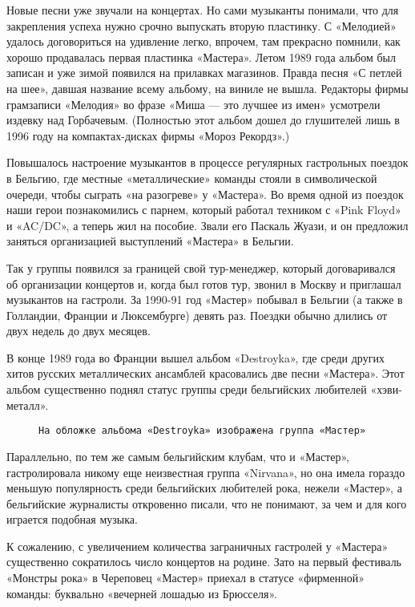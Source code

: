 Новые песни уже звучали на концертах. Но сами музыканты понимали, что для закрепления успеха нужно срочно выпускать
вторую пластинку. С «Мелодией» удалось договориться на удивление легко, впрочем, там прекрасно помнили, как хорошо
продавалась первая пластинка «Мастера». Летом 1989 года альбом был записан и уже зимой появился на прилавках магазинов.
Правда песня «С петлей на шее», давшая название всему альбому, на виниле не вышла. Редакторы фирмы грамзаписи «Мелодия»
во фразе «Миша — это лучшее из имен» усмотрели издевку над Горбачевым. (Полностью этот альбом дошел до глушителей лишь в
1996 году на компактах-дисках фирмы «Мороз Рекордз».)

Повышалось настроение музыкантов в процессе регулярных гастрольных поездок в Бельгию, где местные «металлические»
команды стояли в символической очереди, чтобы сыграть «на разогреве» у «Мастера». Во время одной из поездок наши герои
познакомились с парнем, который работал техником с «Pink Floyd» и «AC/DC», а теперь жил на пособие. Звали его Паскаль
Жуази, и он предложил заняться организацией выступлений «Мастера» в Бельгии.

Так у группы появился за границей свой тур-менеджер, который договаривался об организации концертов и, когда был готов
тур, звонил в Москву и приглашал музыкантов на гастроли. За 1990-91 год «Мастер» побывал в Бельгии (а также в Голландии,
Франции и Люксембурге) девять раз. Поездки обычно длились от двух недель до двух месяцев.

В конце 1989 года во Франции вышел альбом «Destroyka», где среди других хитов русских металлических ансамблей
красовались две песни «Мастера». Этот альбом существенно поднял статус группы среди бельгийских любителей «хэви-металл».

\begin{wrapfigure}{L}{0.5\textwidth}
    \centering
    \caption{\texttt{На обложке альбома «Destroykа» изображена группа «Мастер»}}
\end{wrapfigure}

Параллельно, по тем же самым бельгийским клубам, что и «Мастер», гастролировала никому еще неизвестная группа «Nirvana»,
но она имела гораздо меньшую популярность среди бельгийских любителей рока, нежели «Мастер», а бельгийские журналисты
откровенно писали, что не понимают, за чем и для кого играется подобная музыка.

К сожалению, с увеличением количества заграничных гастролей у «Мастера» существенно сократилось число концертов на
родине. Зато на первый фестиваль «Монстры рока» в Череповец «Мастер» приехал в статусе «фирменной» команды: буквально
«вечерней лошадью из Брюсселя».

